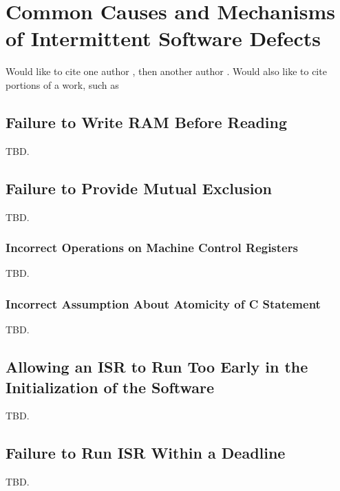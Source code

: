 \section{Common Causes and Mechanisms of Intermittent Software Defects}
\label{scmd0}

Would like to cite one author \cite{lamport94}, then another author \cite{lamport95}.
Would also like to cite portions of a work, such as \cite[p. 314]{lamport95}


\subsection{Failure to Write RAM Before Reading}
\label{scmd0:sfwr0}

TBD.


\subsection{Failure to Provide Mutual Exclusion}
\label{scmd0:sfme0}

TBD.


\subsubsection{Incorrect Operations on Machine Control Registers}
\label{scmd0:siom0}

TBD.



\subsubsection{Incorrect Assumption About Atomicity of C Statement}
\label{scmd0:siac0}

TBD.


\subsection{Allowing an ISR to Run Too Early in the Initialization
            of the Software}
\label{scmd0:sait0}

TBD.


\subsection{Failure to Run ISR Within a Deadline}
\label{scmd0:sfid0}

TBD.

